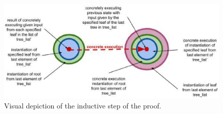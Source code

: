 \begin{figure}
\centering
\includegraphics[width=.8\textwidth]{set4.eps}
\caption{Visual depiction of the inductive step of the proof.}
\label{fig:indstep}
\end{figure}
